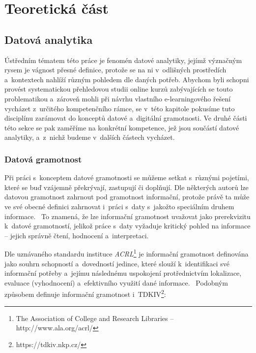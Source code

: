 \part{Teoretická část}

\hypertarget{datovuxe1-analytika}{%
\chapter{Datová analytika}\label{datovuxe1-analytika}}

Ústředním tématem této práce je fenomén datové analytiky, jejímž význačným rysem je vágnost přesné definice, protože se na ni v~odlišných prostředích a~kontextech nahlíží různým pohledem dle daných potřeb. Abychom byli schopni provést systematickou přehledovou studii online kurzů zabývajících se touto problematikou a~zároveň mohli při návrhu vlastního e-learningového řešení vycházet z~určitého kompetenčního rámce, se v~této kapitole pokusíme tuto disciplínu zarámovat do konceptů datové a~digitální gramotnosti. Ve druhé části této sekce se pak zaměříme na konkrétní kompetence, jež jsou součástí datové analytiky, a~z~nichž budeme v~dalších částech vycházet.

\hypertarget{datovuxe1-gramotnost}{%
\section{Datová gramotnost}\label{datovuxe1-gramotnost}}

Při práci s~konceptem datové gramotnosti se můžeme setkat s~různými pojetími, které se buď vzájemně překrývají, zastupují či doplňují. Dle některých autorů lze datovou gramotnost zahrnout pod gramotnost informační, protože právě ta může ve své obecné definici zahrnovat i~práci s~daty s~jakožto speciálním druhem informace.~\parencite[126]{calzada13} To znamená, že lze informační gramotnost uvažovat jako prerekvizitu k~datové gramotností, jelikož práce s~daty vyžaduje kritický pohled na informace -- jejich správně čtení, hodnocení a~interpretaci.

Dle uznávaného standardu instituce \emph{ACRL}\footnote{The Association of College and Research Libraries – http://www.ala.org/acrl/} je informační gramotnost definována jako souhrn schopností a~dovedností jedince, které slouží k~identifikaci své informační potřeby a~jejímu následnému uspokojení protřednictvím lokalizace, evaluace (vyhodnocení) a~efektivního využití dané informace.~\parencite[2]{acrl14} Podobným způsobem definuje informační gramotnost i~TDKIV\footnote{https://tdkiv.nkp.cz/}: ~\parencite{tdkiv03}

